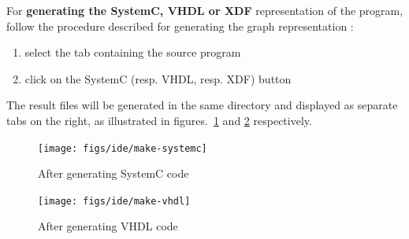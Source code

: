 \medskip
For \textbf{generating the SystemC, VHDL or XDF} representation of the program, follow the procedure
described for generating the graph representation :
\begin{enumerate}
\item select the tab containing the source program
\item click on the \textsf{SystemC} (resp. \textsf{VHDL}, resp. \textsf{XDF}) button
\end{enumerate}
The result files will be generated in the same directory and displayed as separate tabs on the
right, as illustrated in figures.~\ref{fig:make-systemc} and \ref{fig:make-vhdl} respectively.

\begin{figure}[h]
  \centering
  \texttt{[image: figs/ide/make-systemc]}
  \caption{After generating SystemC code}
  \label{fig:make-systemc}
\end{figure}

\begin{figure}[h]
  \centering
  \texttt{[image: figs/ide/make-vhdl]}
  \caption{After generating VHDL code}
  \label{fig:make-vhdl}
\end{figure}

